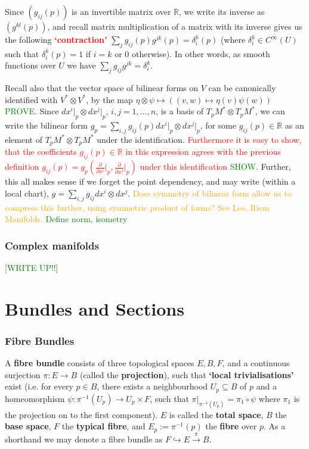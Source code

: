 \documentclass[a4paper]{article}
\theoremstyle{definition} \newtheorem*{definition}{Definition}
\theoremstyle{definition} \newtheorem*{definitions}{Definitions}
\theoremstyle{plain} \newtheorem{theorem}{Theorem}[section]
\theoremstyle{plain} \newtheorem{proposition}[theorem]{Proposition}
\theoremstyle{plain} \newtheorem{corollary}[theorem]{Corollary}
\theoremstyle{plain} \newtheorem{lemma}[theorem]{Lemma}
\theoremstyle{plain} \newtheorem{example}[theorem]{Example}
\newcommand{\checkCorrect}[1]{\textcolor{red}{#1}}
\newcommand{\question}[1]{\textcolor{orange}{#1}}
\newcommand{\finish}[1]{\textcolor{green}{#1}}
\newcommand{\defn}[1]{\textbf{#1}}
\newcommand{\realnos}{\mathbb{R}}
\begin{document}
Since $(g_{ij}(p))$ is an invertible matrix over $\realnos$, we write its inverse as $(g^{kl}(p))$, and recall matrix multiplication of a matrix with its inverse gives us the following \checkCorrect{\defn{`contraction'}}
$\sum_j g_{ij}(p)g^{jk}(p)=\delta_i^k(p)$ (where $\delta_i^k\in C^\infty(U)$ such that $\delta_i^k(p)=1$ if $i=k$ or $0$ otherwise). In other words, as smooth functions over $U$ we have $\sum_j g_{ij}g^{jk}=\delta_i^k$. 

Recall also that the vector space of bilinear forms on $V$ can be canonically identified with $V^\ast \otimes V^\ast$, by the map $\eta\otimes \psi \mapsto ((v,w)\mapsto \eta(v)\psi(w))$ \finish{PROVE}. Since $dx^i\vert_p\otimes dx^j\vert_p$, $i,j=1,\ldots, n$, is a basis of $T_pM^\ast \otimes T_pM^\ast$, we can write the bilinear form $g_p=\sum_{i,j} g_{ij}(p)dx^i\vert_p \otimes dx^j\vert_p$, for some $g_{ij}(p)\in \realnos$ as an element of $T_pM^\ast \otimes T_pM^\ast$ under the identification. \checkCorrect{Furthermore it is easy to show, that the coefficients $g_{ij}(p)\in \realnos$ in this expression agrees with the previous definition $g_{ij}(p)=g_p(\frac{\partial}{\partial x^i}\vert_p, \frac{\partial}{\partial x^j}\vert_p)$ under this identification \finish{SHOW}.} Further, this all makes sense if we forget the point dependency, and may write (within a local chart), $g=\sum_{i,j}g_{ij} dx^i\otimes dx^j$. \question{Does symmetry of bilinear form allow us to compress this further, using symmetric product of forms? See Lee, Riem Manifolds.} 
\finish{Define norm, isometry}

\subsubsection{Complex manifolds}
\finish{[WRITE UP!!]}

\section{Bundles and Sections}

\subsubsection{Fibre Bundles}

A \defn{fibre bundle} consists of three topological spaces $E, B, F$, and a continuous surjection $\pi:E\rightarrow B$ (called the \defn{projection}), such that \defn{`local trivialisations'} exist (i.e. for every $p\in B$, there exists a neighbourhood $U_p\subseteq B$ of $p$ and a homeomorphism $\psi: \pi^{-1}(U_p) \rightarrow U_p \times F$, such that $\pi \vert_{\pi^{-1}(U_p)} = \pi_1 \circ \psi$ where $\pi_1$ is the projection on to the first component). $E$ is called the \defn{total space}, $B$ the \defn{base space}, $F$ the \defn{typical fibre}, and $E_p:=\pi^{-1}(p)$ the \defn{fibre} over $p$. As a shorthand we may denote a fibre bundle as $F\hookrightarrow E\xrightarrow{\pi} B$.
\end{document}
